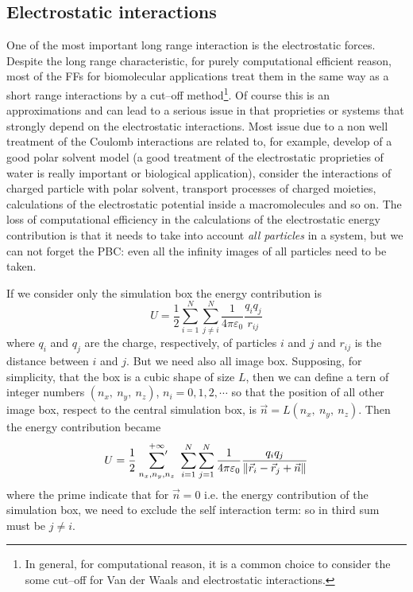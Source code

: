 \subsection{Electrostatic interactions}
\label{sec:longRangeInt}
One of the most important long range interaction is the electrostatic forces. Despite the long range characteristic, for purely computational efficient reason, most of the \acp{FF} for biomolecular applications treat them in the same way as a short range interactions by a cut--off method\footnote{In general, for computational reason, it is a common choice to consider the some cut--off for Van der Waals and electrostatic interactions.}. Of course this is an approximations and can lead to a serious issue in that proprieties or systems that strongly depend on the electrostatic interactions. Most issue due to a non well treatment of the Coulomb interactions are related to, for example, develop of a good polar solvent model (a good treatment of the electrostatic proprieties of water is really important or biological application), consider the interactions of charged particle with polar solvent, transport processes of charged moieties, calculations of the electrostatic potential inside a macromolecules and so on. The loss of computational efficiency in the calculations of the electrostatic energy contribution is that it needs to take into account \textit{all particles} in a system, but we can not forget the \ac{PBC}: even all the infinity images of all particles need to be taken. 

If we consider only the simulation box the energy contribution is
\begin{equation}
	U = \frac{1}{2}\sum_{i=1}^N\sum_{j\ne i}^N\frac{1}{4\pi\varepsilon_0}\frac{q_iq_j}{r_{ij}}
	\label{eq:electrostatic}
\end{equation}
where $q_i$ and $q_j$ are the charge, respectively, of particles $i$ and $j$ and $r_{ij}$ is the distance between $i$ and $j$. But we need also all image box. Supposing, for simplicity, that the box is a cubic shape of size $L$, then we can define a tern of integer numbers $(n_x,\ n_y,\ n_z)$, $n_i=0,1,2,\cdots$ so that the position of all other image box, respect to the central simulation box, is $\vec n = L (n_x,\ n_y,\ n_z)$. Then the energy contribution became
\begin{equation}
	U = \frac{1}{2}\ \sideset{}{'}\sum_{n_x,n_y,n_z}^{+\infty}\ \sum_{i=1}^N\sum_{j=1}^N\frac{1}{4\pi\varepsilon_0}\frac{q_iq_j}{\|\vec r_i - \vec r_j + \vec n \|}
	\label{eq:electrostaticImage}
\end{equation}
where the prime indicate that for $\vec n = 0$ i.e. the energy contribution of the simulation box, we need to exclude the self interaction term: so in third sum must be $j \ne i$.
 
